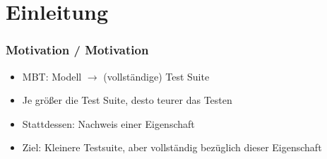 \section{Einleitung}

\begin{frame}
  \frametitle{Motivation / Motivation}
  \begin{itemize}
    \item MBT: Modell $\rightarrow$ (vollständige) Test Suite
    \item Je größer die Test Suite, desto teurer das Testen
    \item<2-> Stattdessen: Nachweis einer Eigenschaft
    \item<3-> Ziel: Kleinere Testsuite, aber vollständig bezüglich dieser Eigenschaft
  \end{itemize}
\end{frame}
